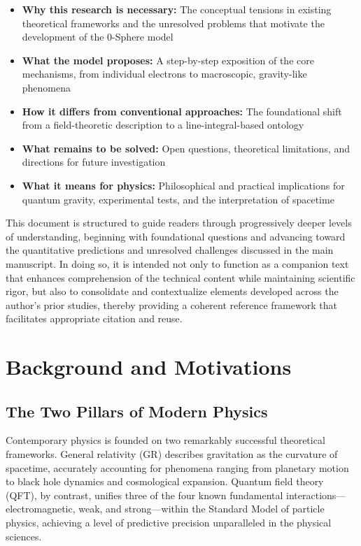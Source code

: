 \documentclass[12pt,letterpaper]{article}
\begin{document}
\begin{itemize}
\item \textbf{Why this research is necessary:} The conceptual tensions in existing theoretical frameworks and the unresolved problems that motivate the development of the 0-Sphere model
\item \textbf{What the model proposes:} A step-by-step exposition of the core mechanisms, from individual electrons to macroscopic, gravity-like phenomena
\item \textbf{How it differs from conventional approaches:} The foundational shift from a field-theoretic description to a line-integral-based ontology
\item \textbf{What remains to be solved:} Open questions, theoretical limitations, and directions for future investigation
\item \textbf{What it means for physics:} Philosophical and practical implications for quantum gravity, experimental tests, and the interpretation of spacetime
\end{itemize}

This document is structured to guide readers through progressively deeper levels of understanding, beginning with foundational questions and advancing toward the quantitative predictions and unresolved challenges discussed in the main manuscript. In doing so, it is intended not only to function as a companion text that enhances comprehension of the technical content while maintaining scientific rigor, but also to consolidate and contextualize elements developed across the author's prior studies, thereby providing a coherent reference framework that facilitates appropriate citation and reuse.


\section{Background and Motivations}
\label{sec:background}

\justifying

\subsection{The Two Pillars of Modern Physics}
\label{subsec:two_pillars}

Contemporary physics is founded on two remarkably successful theoretical frameworks. General relativity (GR) describes gravitation as the curvature of spacetime, accurately accounting for phenomena ranging from planetary motion to black hole dynamics and cosmological expansion. Quantum field theory (QFT), by contrast, unifies three of the four known fundamental interactions—electromagnetic, weak, and strong—within the Standard Model of particle physics, achieving a level of predictive precision unparalleled in the physical sciences.
\end{document}
